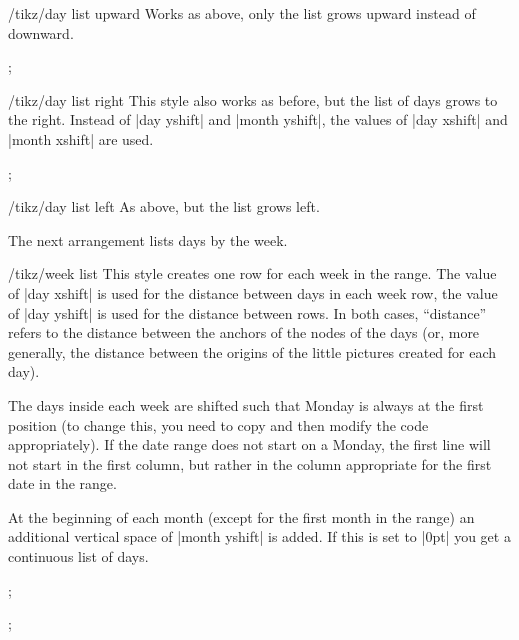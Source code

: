 \begin{stylekey}{/tikz/day list upward}
    Works as above, only the list grows upward instead of downward.
\begin{codeexample}[preamble={\usetikzlibrary{calendar}}]
\tikz
  \calendar [dates=2000-01-28 to 2000-02-03,
             day list upward,month yshift=1em];
\end{codeexample}
\end{stylekey}

\begin{stylekey}{/tikz/day list right}
    This style also works as before, but the list of days grows to the right.
    Instead of |day yshift| and |month yshift|, the values of |day xshift| and
    |month xshift| are used.
\begin{codeexample}[preamble={\usetikzlibrary{calendar}}]
\tikz
  \calendar [dates=2000-01-28 to 2000-02-03,
             day list right,month xshift=1em];
\end{codeexample}
\end{stylekey}

\begin{stylekey}{/tikz/day list left}
    As above, but the list grows left.
\end{stylekey}

The next arrangement lists days by the week.

\begin{stylekey}{/tikz/week list}
    This style creates one row for each week in the range. The value of
    |day xshift| is used for the distance between days in each week row, the
    value of |day yshift| is used for the distance between rows. In both cases,
    ``distance'' refers to the distance between the anchors of the nodes of the
    days (or, more generally, the distance between the origins of the little
    pictures created for each day).

    The days inside each week are shifted such that Monday is always at the
    first position (to change this, you need to copy and then modify the code
    appropriately). If the date range does not start on a Monday, the first
    line will not start in the first column, but rather in the column
    appropriate for the first date in the range.

    At the beginning of each month (except for the first month in the range) an
    additional vertical space of |month yshift| is added. If this is set to
    |0pt| you get a continuous list of days.
\begin{codeexample}[preamble={\usetikzlibrary{calendar}}]
\tikz
  \calendar [dates=2000-01-01 to 2000-02-last,week list];
\end{codeexample}
\begin{codeexample}[preamble={\usetikzlibrary{calendar}}]
\tikz
  \calendar [dates=2000-01-01 to 2000-02-last,week list,
             month yshift=0pt];
\end{codeexample}
\end{stylekey}

